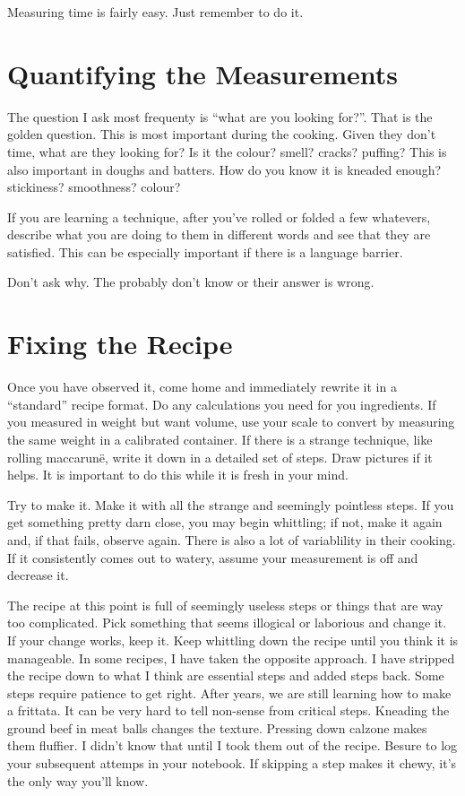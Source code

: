 Measuring time is fairly easy. Just remember to do it.

\section{Quantifying the Measurements}
The question I ask most frequenty is ``what are you looking for?''. That is the golden question. This is most important during the cooking. Given they don't time, what are they looking for? Is it the colour? smell? cracks? puffing? This is also important in doughs and batters. How do you know it is kneaded enough? stickiness? smoothness? colour?

If you are learning a technique, after you've rolled or folded a few whatevers, describe what you are doing to them in different words and see that they are satisfied. This can be especially important if there is a language barrier.

Don't ask why. The probably don't know or their answer is wrong.

\section{Fixing the Recipe}
Once you have observed it, come home and immediately rewrite it in a ``standard'' recipe format. Do any calculations you need for you ingredients. If you measured in weight but want volume, use your scale to convert by measuring the same weight in a calibrated container. If there is a strange technique, like rolling maccarunë, write it down in a detailed set of steps. Draw pictures if it helps. It is important to do this while it is fresh in your mind.

Try to make it. Make it with all the strange and seemingly pointless steps. If you get something pretty darn close, you may begin whittling; if not, make it again and, if that fails, observe again. There is also a lot of variablility in their cooking. If it consistently comes out to watery, assume your measurement is off and decrease it.

The recipe at this point is full of seemingly useless steps or things that are way too complicated. Pick something that seems illogical or laborious and change it. If your change works, keep it. Keep whittling down the recipe until you think it is manageable. In some recipes, I have taken the opposite approach. I have stripped the recipe down to what I think are essential steps and added steps back. Some steps require patience to get right. After years, we are still learning how to make a frittata. It can be very hard to tell non-sense from critical steps. Kneading the ground beef in meat balls changes the texture. Pressing down calzone makes them fluffier. I didn't know that until I took them out of the recipe. Besure to log your subsequent attemps in your notebook. If skipping a step makes it chewy, it's the only way you'll know.

